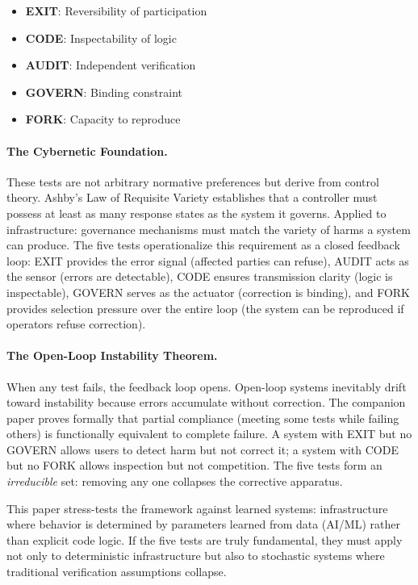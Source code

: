 \documentclass[11pt,a4paper]{article}
\theoremstyle{definition}
\begin{document}
\begin{itemize}[noitemsep]
    \item \textbf{EXIT}: Reversibility of participation
    \item \textbf{CODE}: Inspectability of logic
    \item \textbf{AUDIT}: Independent verification
    \item \textbf{GOVERN}: Binding constraint
    \item \textbf{FORK}: Capacity to reproduce
\end{itemize}

\paragraph{The Cybernetic Foundation.} These tests are not arbitrary normative preferences but derive from control theory. Ashby's Law of Requisite Variety \citep{ashby1956} establishes that a controller must possess at least as many response states as the system it governs. Applied to infrastructure: governance mechanisms must match the variety of harms a system can produce. The five tests operationalize this requirement as a closed feedback loop: EXIT provides the error signal (affected parties can refuse), AUDIT acts as the sensor (errors are detectable), CODE ensures transmission clarity (logic is inspectable), GOVERN serves as the actuator (correction is binding), and FORK provides selection pressure over the entire loop (the system can be reproduced if operators refuse correction).

\paragraph{The Open-Loop Instability Theorem.} When any test fails, the feedback loop opens. Open-loop systems inevitably drift toward instability because errors accumulate without correction. The companion paper proves formally that partial compliance (meeting some tests while failing others) is functionally equivalent to complete failure. A system with EXIT but no GOVERN allows users to detect harm but not correct it; a system with CODE but no FORK allows inspection but not competition. The five tests form an \textit{irreducible} set: removing any one collapses the corrective apparatus.

This paper stress-tests the framework against learned systems: infrastructure where behavior is determined by parameters learned from data (AI/ML) rather than explicit code logic. If the five tests are truly fundamental, they must apply not only to deterministic infrastructure but also to stochastic systems where traditional verification assumptions collapse.
\end{document}
